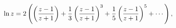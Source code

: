 \[\mathop{\ln\/}\nolimits z=2\left(\left(\frac{z-1}{z+1}\right)+\frac{1}{3}\left%
(\frac{z-1}{z+1}\right)^{3}+\frac{1}{5}\left(\frac{z-1}{z+1}\right)^{5}+\cdots%
\right),\]